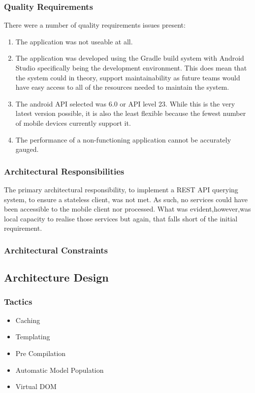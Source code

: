 \documentclass[a4paper,10pt]{article}
\begin{document}
    \subsubsection{Quality Requirements}
    There were a number of quality requirements issues present:
    \begin{enumerate}
	\item The application was not useable at all.
	\item The application was developed using the Gradle build system with    Android Studio specifically being the development environment. This does mean that the system could in theory, support maintainability as future teams would have easy access to all of the resources needed to maintain the system.
	\item The android API selected was 6.0 or API level 23. While this is the very latest version possible, it is also the least flexible because the fewest number of mobile devices currently support it.
	
	\item The performance of a non-functioning application cannot be accurately gauged.
    \end{enumerate}
    \subsubsection{Architectural Responsibilities}
    The primary architectural responsibility, to implement a REST API querying system, to ensure a stateless client, was not met. As such, no services could have been accessible to the mobile client nor processed. What was evident,however,was local capacity to realise those services but again, that falls short of the initial requirement.
    \subsubsection{Architectural Constraints}
  \subsection{Architecture Design}
    \subsubsection{Tactics}
      \begin{itemize}
        \item Caching
        \item Templating
        \item Pre Compilation
        \item Automatic Model Population
        \item Virtual DOM
      \end{itemize}
\end{document}
